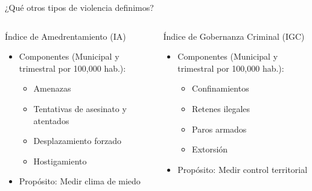 \begin{frame}{¿Qué otros tipos de violencia definimos?}
    \pause
    \begin{columns}[T]
        \begin{column}{0.48\textwidth}
            \begin{block}{Índice de Amedrentamiento (IA)}
                \begin{itemize}
                    \item Componentes (Municipal y trimestral por 100,000 hab.):
                    \begin{itemize}
                        \item Amenazas
                        \item Tentativas de asesinato y atentados
                        \item Desplazamiento forzado
                        \item Hostigamiento
                    \end{itemize}
                    \item \alert{Propósito}: Medir clima de miedo
                \end{itemize}
            \end{block}
        \end{column}
        
        \begin{column}{0.48\textwidth}
            \begin{block}{Índice de Gobernanza Criminal (IGC)}
                \begin{itemize}
                    \item Componentes (Municipal y trimestral por 100,000 hab.):
                    \begin{itemize}
                        \item Confinamientos
                        \item Retenes ilegales
                        \item Paros armados
                        \item Extorsión
                    \end{itemize}
                    \item \alert{Propósito}: Medir control territorial
                \end{itemize}
            \end{block}
        \end{column}
    \end{columns}
\end{frame}

